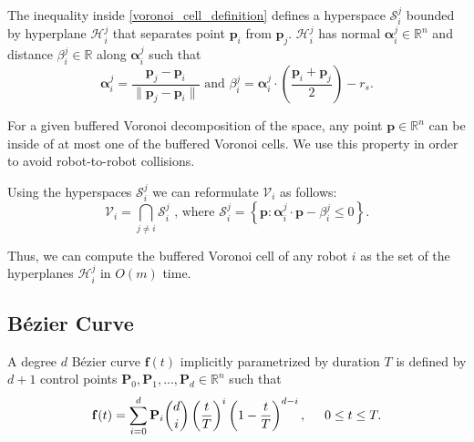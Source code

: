 \documentclass{svproc}
\newcommand{\vp}{\mathbf{p}}
\newcommand{\valpha}{\mathbf{\alpha}}
\newcommand{\vP}{\mathbf{P}}
\newcommand{\vf}{\mathbf{f}}
\newcommand{\cV}{\mathcal{V}}
\newcommand{\cS}{\mathcal{S}}
\newcommand{\cH}{\mathcal{H}}
\newcommand{\R}{\mathbb{R}} %
\begin{document}
The inequality inside \eqref{voronoi_cell_definition} defines a hyperspace $\cS_i^j$ bounded by hyperplane $\cH_i^j$ that separates point $\vp_i$ from $\vp_j$. $\cH_i^j$ has normal $\valpha_i^j \in \R^n$ and distance $\beta_i^j\in \R$ along $\valpha_i^j$ such that
\begin{equation}
    \valpha_i^j = \frac{\vp_j - \vp_i}{\|\vp_j-\vp_i\|} \text{ and }
    \beta_i^j = \valpha_i^j \cdot \left(\frac{\vp_i + \vp_j}{2}\right) - r_s.
    \label{voronoiAlphaBeta}
\end{equation}

For a given buffered Voronoi decomposition of the space, any point $\vp\in \R^n$ can be inside of at most one of the buffered Voronoi cells.
We use this property in order to avoid robot-to-robot collisions.

Using the hyperspaces $\cS_i^j$ we can reformulate $\cV_i$ as follows:
\begin{equation}
    \cV_i = \bigcap\limits_{j\neq i} \cS_i^j \text{ , where } \cS_i^j = \left\{\vp : \valpha_i^j \cdot \vp - \beta_i^j \leq 0\right\}.
    \label{voronoiEquation}
\end{equation}


Thus, we can compute the buffered Voronoi cell of any robot $i$ as the set of the hyperplanes $\cH_i^j$ in $O(m)$ time.

\subsection{B\'ezier Curve} \label{bezierCurves}
A degree $d$ B\'ezier curve $\vf(t)$ implicitly parametrized by duration $T$ is defined by $d+1$ control points $\vP_0, \vP_1, ..., \vP_d \in \R^n$ such that
\begin{align}
    \vf(t) = \sum_{i=0}^d \vP_i {d\choose i}\left(\frac{t}{T}\right)^i\left(1-\frac{t}{T}\right)^{d-i},\hskip .5cm 0\leq t \leq T.
\end{align}
\end{document}
